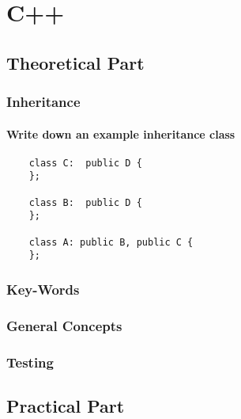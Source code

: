 \chapter{   C++}

%

\section{Theoretical Part}

\subsection{Inheritance}
\subsubsection{Write down an example inheritance class}
\begin{lstlisting}
    class C:  public D {
    };

    class B:  public D {
    };

    class A: public B, public C {
    };
\end{lstlisting}

\subsection{Key-Words}
\subsection{General Concepts}
\subsection{Testing}





\section{Practical Part}


